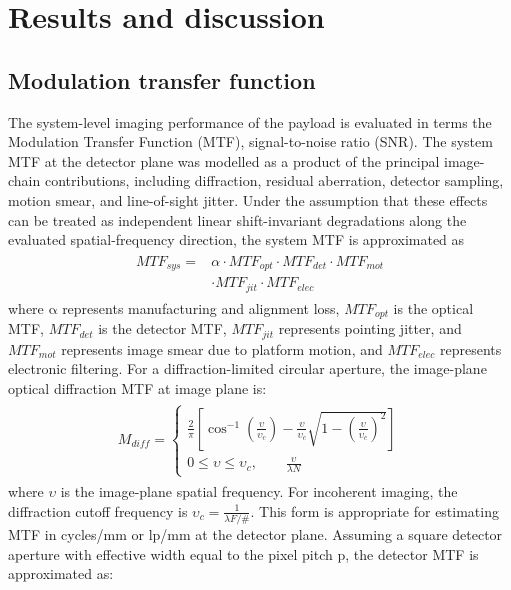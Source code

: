 \documentclass{iac}
\begin{document}
\section{Results and discussion}
\subsection{Modulation transfer function}
The system-level imaging performance of the payload is evaluated in terms the Modulation Transfer Function (MTF), signal-to-noise ratio (SNR). The system MTF at the detector plane was modelled as a product of the principal image-chain contributions, including diffraction, residual aberration, detector sampling, motion smear, and line-of-sight jitter. Under the assumption that these effects can be treated as independent linear shift-invariant degradations along the evaluated spatial-frequency direction, the system MTF is approximated as
\begin{eqnarray}
	\begin{split}
		MTF_{sys} =  & \alpha \cdot MTF_{opt} \cdot MTF_{det} \cdot MTF_{mot} \\
		&  \cdot MTF_{jit} \cdot MTF_{elec}
	\end{split}
	\label{eqn:mtf_system}
\end{eqnarray}
where \(\mathrm{\alpha}\) represents manufacturing and alignment loss, \(MTF_{opt}\) is the optical MTF, \(MTF_{det}\) is the detector MTF, \(MTF_{jit}\) represents pointing jitter,  and \(MTF_{mot}\) represents image smear due to platform motion, and \( MTF_{elec}\) represents electronic filtering. For a diffraction-limited circular aperture, the image-plane optical diffraction MTF at image plane is:
\begin{eqnarray} 
	\begin{aligned}
	M_{diff} =
	\begin{cases}
		\displaystyle \frac{2}{\pi} \left[\cos^{-1}\left(\frac{\upsilon}{\upsilon_c}\right) - \frac{\upsilon}{\upsilon_c}
		\sqrt{1-\left(\frac{\upsilon}{\upsilon_c}\right)^2}\right] \\%
		0\leq \upsilon \leq \upsilon_c, \qquad \frac{\upsilon}{\lambda N}	
	\end{cases}
	\end{aligned}
	\label{eqn:diff_mtf}
\end{eqnarray}
where \(\upsilon\) is the image-plane spatial frequency. For incoherent imaging, the diffraction cutoff frequency is \(\upsilon_c  = \frac{1}{\lambda F/\#}.\) This form is appropriate for estimating MTF in cycles/mm or lp/mm at the detector plane. Assuming a square detector aperture with effective width equal to the pixel pitch p, the detector MTF is approximated as:
\end{document}
